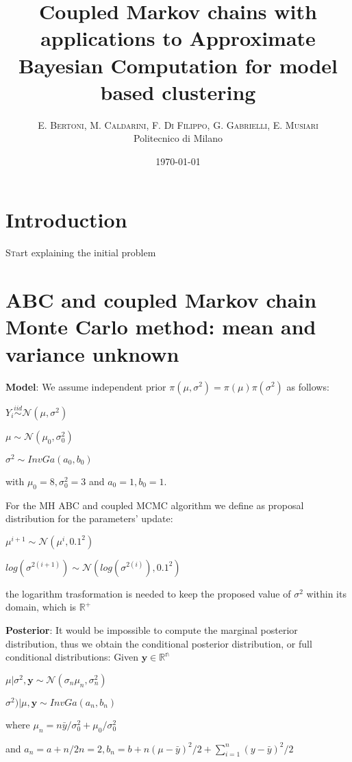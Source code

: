 \documentclass{article}
\title{Coupled Markov chains with applications to Approximate Bayesian Computation for model based clustering} %
\author{%
	\textsc{E. Bertoni, M. Caldarini, F. Di Filippo, G. Gabrielli, E. Musiari} \\[1ex] %
	\normalsize Politecnico di Milano \\ %
}
\date{\today} %
\begin{document}
	
	\maketitle
	
	
	\section{Introduction}
	
	\lettrine[nindent=0em,lines=3]{S}tart explaining the initial problem
	
	
	\section{ABC and coupled Markov chain Monte Carlo method: mean and variance unknown}
	\textbf{Model}:
 	We assume independent prior $\pi(\mu,\sigma^2)=\pi(\mu)\pi(\sigma^2)$ as follows:
	\begin{center}
	
	$ Y_i \stackrel{iid}{\sim} \mathcal{N}( \mu, \sigma^2) $
	
	$ \mu \sim	\mathcal{N}( \mu_0, \sigma^2_0) $
	
	$ \sigma^2 \sim InvGa( a_0, b_0) $
\end{center}
	with $\mu_0=8, \sigma_0^2=3$ and $a_0=1, b_0=1$.
	
	
	For the MH ABC and coupled MCMC algorithm we define as proposal distribution for the parameters' update:
	\begin{center}
	$ \mu^{i+1} \sim	\mathcal{N}( \mu^{i}, 0.1^2) $
	
	$ log(\sigma^{2(i+1)}) \sim \mathcal{N}( log(\sigma^{2(i)}), 0.1^2) $
	\end{center}
	the logarithm trasformation is needed to keep the proposed value of $ \sigma^2$ within its domain, 
	which is $\mathbb{R^{+}}$

	
	\textbf{Posterior}:
	It would be impossible to compute the marginal posterior distribution, thus we obtain the conditional posterior distribution, or full conditional distributions:
	Given $\mathbf{y} \in \mathbb{R^{n}} $
	\begin{center}
		
		$ \mu| \sigma^2,\mathbf{y} \sim	\mathcal{N}( \sigma_n\mu_n, \sigma_n^2) $
		
		$ \sigma^{2})| \mu,\mathbf{y} \sim InvGa( a_n,b_n) $
		
		where $ \mu_n= n\bar y/\sigma_0^2 + \mu_0/\sigma_0^2$
	\end{center}		
		and $a_n= a + n/2n=2, b_n=b + n(\mu-\bar y)^2/2 +	\sum_{i=1}^n (y-\bar y)^2/2 $
\end{document}

